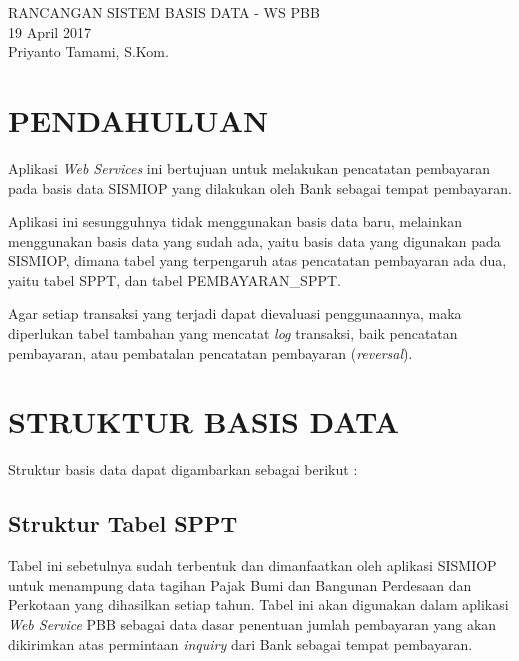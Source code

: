 \documentclass[pdftex,12pt, oneside]{article}
\begin{document}
\sloppy %

\begin{center}
{\large RANCANGAN SISTEM BASIS DATA - WS PBB}
\\[1cm]
19 April 2017\\
Priyanto Tamami, S.Kom.
\end{center}




\section{PENDAHULUAN}

Aplikasi \textit{Web Services} ini bertujuan untuk melakukan pencatatan pembayaran pada basis data SISMIOP yang dilakukan oleh Bank sebagai tempat pembayaran.

Aplikasi ini sesungguhnya tidak menggunakan basis data baru, melainkan menggunakan basis data yang sudah ada, yaitu basis data yang digunakan pada SISMIOP, dimana tabel yang terpengaruh atas pencatatan pembayaran ada dua, yaitu tabel SPPT, dan tabel PEMBAYARAN\_SPPT.

Agar setiap transaksi yang terjadi dapat dievaluasi penggunaannya, maka diperlukan tabel tambahan yang mencatat \textit{log} transaksi, baik pencatatan pembayaran, atau pembatalan pencatatan pembayaran (\textit{reversal}).


\section{STRUKTUR BASIS DATA}

Struktur basis data dapat digambarkan sebagai berikut :

\subsection{Struktur Tabel SPPT}

Tabel ini sebetulnya sudah terbentuk dan dimanfaatkan oleh aplikasi SISMIOP untuk menampung data tagihan Pajak Bumi dan Bangunan Perdesaan dan Perkotaan yang dihasilkan setiap tahun. Tabel ini akan digunakan dalam aplikasi \textit{Web Service} PBB sebagai data dasar penentuan jumlah pembayaran yang akan dikirimkan atas permintaan \textit{inquiry} dari Bank sebagai tempat pembayaran.
\end{document}
